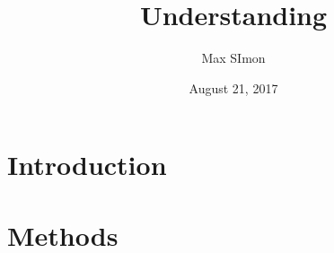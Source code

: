 \documentclass[
12pt, %
parskip=half, %
digital, %
oneside, %
]{bsc}
\title{Understanding}
\author{Max SImon}
\date{August 21, 2017}
\begin{document}
	
\chapter{Introduction}



\chapter{Methods}

\end{document}
